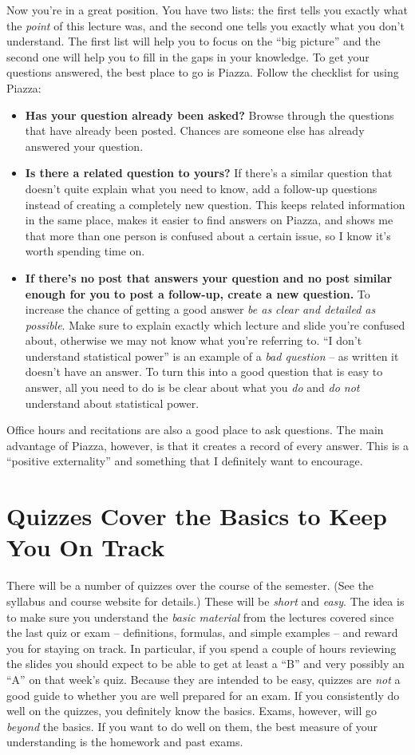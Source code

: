 \documentclass[12pt,letterpaper]{article}
\begin{document}
Now you're in a great position. You have two lists: the first tells you exactly what the \emph{point} of this lecture was, and the second one tells you exactly what you don't understand. The first list will help you to focus on the ``big picture'' and the second one will help you to fill in the gaps in your knowledge. To get your questions answered, the best place to go is Piazza. Follow the checklist for using Piazza:
\begin{itemize}[nolistsep]
	\item \textbf{Has your question already been asked?} Browse through the questions that have already been posted. Chances are someone else has already answered your question.
	\item \textbf{Is there a related question to yours?} If there's a similar question that doesn't quite explain what you need to know, add a follow-up questions instead of creating a completely new question. This keeps related information in the same place, makes it easier to find answers on Piazza, and shows me that more than one person is confused about a certain issue, so I know it's worth spending time on.
	\item \textbf{If there's no post that answers your question and no post similar enough for you to post a follow-up, create a new question.} To increase the chance of getting a good answer \emph{be as clear and detailed as possible}. Make sure to explain exactly which lecture and slide you're confused about, otherwise we may not know what you're referring to. ``I don't understand statistical power'' is an example of a \emph{bad question} -- as written it doesn't have an answer. To turn this into a good question that is easy to answer, all you need to do is be clear about what you \emph{do} and \emph{do not} understand about statistical power. 
\end{itemize} 
Office hours and recitations are also a good place to ask questions. The main advantage of Piazza, however, is that it creates a record of every answer. This is a ``positive externality'' and something that I definitely want to encourage.

\section{Quizzes Cover the Basics to Keep You On Track}
There will be a number of quizzes over the course of the semester. (See the syllabus and course website for details.) These will be \emph{short} and \emph{easy}. The idea is to make sure you understand the \emph{basic material} from the lectures covered since the last quiz or exam -- definitions, formulas, and simple examples -- and reward you for staying on track. In particular, if you spend a couple of hours reviewing the slides you should expect to be able to get at least a ``B'' and very possibly an ``A'' on that week's quiz. Because they are intended to be easy, quizzes are \emph{not} a good guide to whether you are well prepared for an exam. If you consistently do well on the quizzes, you definitely know the basics. Exams, however, will go \emph{beyond} the basics. If you want to do well on them, the best measure of your understanding is the homework and past exams.
\end{document}
